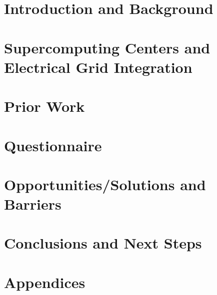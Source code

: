 \documentclass[runningheads]{llncs}
\begin{document}
%
\section{Introduction and Background}

\label{sec:intro}

\section{Supercomputing Centers and Electrical Grid Integration}

\label{sec:supercomputing}

\section{Prior Work}

\label{sec:priorwork}

\section{Questionnaire} 

\label{sec:questionaire}

\section{Opportunities/Solutions and Barriers} 

\label{sec:opportunities}

\section{Conclusions and Next Steps}

\label{sec:conclusion}

\newpage


%
%

%

\section{Appendices}

\label{sec:appendices}
\end{document}
